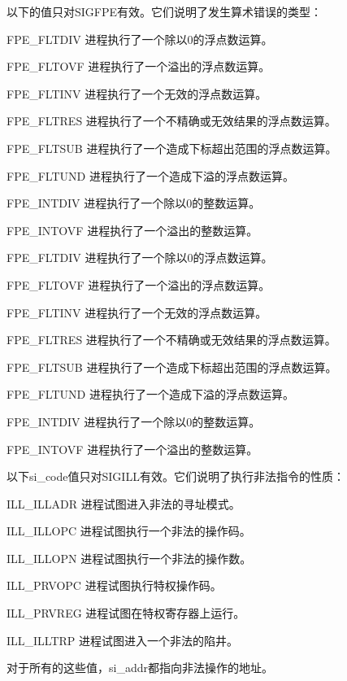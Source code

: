 以下的值只对SIGFPE有效。它们说明了发生算术错误的类型：

\begin{eqlist*}
\item[FPE\_FLTDIV] 进程执行了一个除以0的浮点数运算。
\item[FPE\_FLTOVF] 进程执行了一个溢出的浮点数运算。
\item[FPE\_FLTINV] 进程执行了一个无效的浮点数运算。
\item[FPE\_FLTRES] 进程执行了一个不精确或无效结果的浮点数运算。
\item[FPE\_FLTSUB] 进程执行了一个造成下标超出范围的浮点数运算。
\item[FPE\_FLTUND] 进程执行了一个造成下溢的浮点数运算。
\item[FPE\_INTDIV] 进程执行了一个除以0的整数运算。
\item[FPE\_INTOVF] 进程执行了一个溢出的整数运算。
\item[FPE\_FLTDIV] 进程执行了一个除以0的浮点数运算。
\item[FPE\_FLTOVF] 进程执行了一个溢出的浮点数运算。
\item[FPE\_FLTINV] 进程执行了一个无效的浮点数运算。
\item[FPE\_FLTRES] 进程执行了一个不精确或无效结果的浮点数运算。
\item[FPE\_FLTSUB] 进程执行了一个造成下标超出范围的浮点数运算。
\item[FPE\_FLTUND] 进程执行了一个造成下溢的浮点数运算。
\item[FPE\_INTDIV] 进程执行了一个除以0的整数运算。
\item[FPE\_INTOVF] 进程执行了一个溢出的整数运算。
\end{eqlist*}

以下si\_code值只对SIGILL有效。它们说明了执行非法指令的性质：

\begin{eqlist*}
\item[ILL\_ILLADR] 进程试图进入非法的寻址模式。
\item[ILL\_ILLOPC] 进程试图执行一个非法的操作码。
\item[ILL\_ILLOPN] 进程试图执行一个非法的操作数。
\item[ILL\_PRVOPC] 进程试图执行特权操作码。
\item[ILL\_PRVREG] 进程试图在特权寄存器上运行。
\item[ILL\_ILLTRP] 进程试图进入一个非法的陷井。
\end{eqlist*}

对于所有的这些值，si\_addr都指向非法操作的地址。

